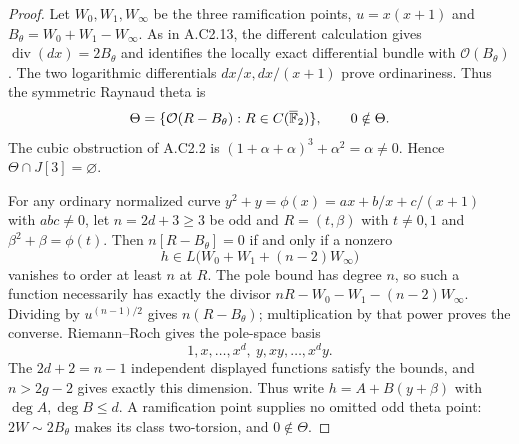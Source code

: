 \begin{proof}
Let $W_0,W_1,W_\infty$ be the three ramification points,
$u=x(x+1)$ and $B_\theta=W_0+W_1-W_\infty$.
As in A.C2.13, the different calculation gives
$\operatorname{div}(dx)=2B_\theta$ and identifies the
locally exact differential bundle with
$\mathcal O(B_\theta)$. The two logarithmic differentials
$dx/x,dx/(x+1)$ prove ordinariness.
Thus the symmetric Raynaud theta is
\[
          \Theta=\{\mathcal O(R-B_\theta):R\in C(\overline{\mathbb F}_2)\},
          \qquad 0\notin\Theta.
\]
The cubic obstruction of A.C2.2 is
$(1+\alpha+\alpha)^3+\alpha^2=\alpha\ne0$.
Hence $\Theta\cap J[3]=\varnothing$.

For any ordinary normalized curve
$y^2+y=\phi(x)=ax+b/x+c/(x+1)$ with $abc\ne0$,
let $n=2d+3\ge3$ be odd and
$R=(t,\beta)$ with $t\ne0,1$ and $\beta^2+\beta=\phi(t)$.
Then $n[R-B_\theta]=0$ if and only if a nonzero
\[
 h\in L\bigl(W_0+W_1+(n-2)W_\infty\bigr)
\]
vanishes to order at least $n$ at $R$.
The pole bound has degree $n$, so such a function
necessarily has exactly the divisor
$nR-W_0-W_1-(n-2)W_\infty$.
Dividing by $u^{(n-1)/2}$ gives $n(R-B_\theta)$;
multiplication by that power proves the converse.
Riemann--Roch gives the pole-space basis
\[
                 1,x,\ldots,x^d,\ y,xy,\ldots,x^dy.
\]
The $2d+2=n-1$ independent displayed functions satisfy
the bounds, and $n>2g-2$ gives exactly this dimension.
Thus write $h=A+B(y+\beta)$ with $\deg A,\deg B\le d$.
A ramification point supplies no omitted odd theta point:
$2W\sim2B_\theta$ makes its class two-torsion,
and $0\notin\Theta$.


\end{proof}
